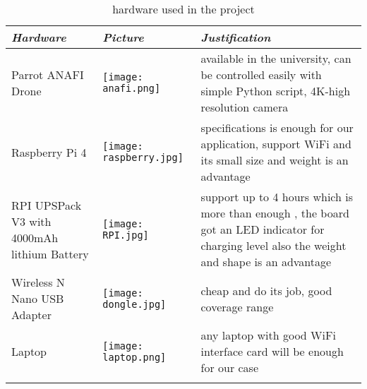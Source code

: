 \documentclass[../main.tex]{subfiles}
\begin{document}
\begin{table}[H]
	\centering
	\caption{hardware used in the project}
	\label{tab:hardware-used}  
	\begin{tabular}{ p{4cm} p{3cm} p{6cm} }
		\toprule
		\textit{Hardware} & \textit{Picture} & \textit{Justification} \\ \midrule
		Parrot ANAFI Drone  & \begin{minipage}{.1\textwidth}
			\texttt{[image: anafi.png]}
		\end{minipage} & available in the university, can be controlled easily 
	   with simple Python script, 4K-high resolution camera  \\ \addlinespace
		Raspberry Pi 4  & \begin{minipage}{.0\textwidth}
			\texttt{[image: raspberry.jpg]}
		\end{minipage} & specifications is enough for our application, support WiFi and its small size and weight is an advantage\\ \addlinespace
		RPI UPSPack V3 with 4000mAh 
		lithium Battery  & \begin{minipage}{.1\textwidth}
			\texttt{[image: RPI.jpg]}
		\end{minipage}  & support up to 4 hours which is more than enough , the board got an LED indicator for charging level also the weight and shape is an advantage  \\ \addlinespace
		Wireless N Nano USB Adapter  & \begin{minipage}{.1\textwidth}
			\texttt{[image: dongle.jpg]}
		\end{minipage} & cheap and do its job, good coverage range  \\ \addlinespace
	   Laptop & \begin{minipage}{.1\textwidth}
			\texttt{[image: laptop.png]}
		\end{minipage} & any laptop with good WiFi interface card will be enough for our case \\ \addlinespace
		\bottomrule
	\end{tabular}
\end{table}    
\end{document}
